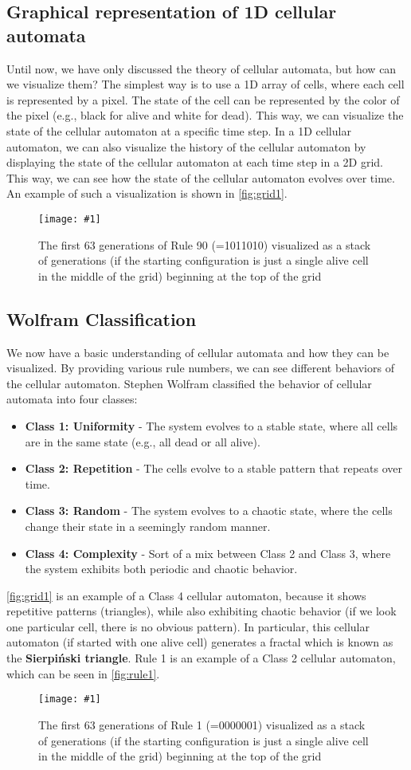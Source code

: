 \documentclass[a4paper,12pt]{llncs}
\numberwithin{equation}{section}
\newcommand{\imagewithwidth}[5]{
  \begin{figure}[htbp]%
    \begin{center}%
      \texttt{[image: \#1]}%
      \caption[#5]{#4}%
      \label{#3}%
    \end{center}%
  \end{figure}
}
\begin{document}
\subsection{Graphical representation of 1D cellular automata}
Until now, we have only discussed the theory of cellular automata, but how can we visualize them?
The simplest way is to use a 1D array of cells, where each cell is represented by a pixel.
The state of the cell can be represented by the color of the pixel (e.g., black for alive and white for dead).
This way, we can visualize the state of the cellular automaton at a specific time step.
In a 1D cellular automaton, we can also visualize the history of the cellular automaton by displaying the state of the cellular automaton at each time step in a 2D grid.
This way, we can see how the state of the cellular automaton evolves over time.
An example of such a visualization is shown in \autoref{fig:grid1}.
\imagewithwidth{figures/rule90}{0.4\textwidth}{fig:grid1}{The first 63 generations of Rule 90 (=1011010) visualized as a stack of generations (if the starting configuration is just a single alive cell in the middle of the grid) beginning at the top of the grid}{}
\subsection{Wolfram Classification}
We now have a basic understanding of cellular automata and how they can be visualized.
By providing various rule numbers, we can see different behaviors of the cellular automaton.
Stephen Wolfram classified the behavior of cellular automata into four classes:
\begin{itemize}
  \item \textbf{Class 1: Uniformity} - The system evolves to a stable state, where all cells are in the same state (e.g., all dead or all alive).
  \item \textbf{Class 2: Repetition} - The cells evolve to a stable pattern that repeats over time.
  \item \textbf{Class 3: Random} - The system evolves to a chaotic state, where the cells change their state in a seemingly random manner.
  \item \textbf{Class 4: Complexity} - Sort of a mix between Class 2 and Class 3, where the system exhibits both periodic and chaotic behavior.
\end{itemize}
\autoref{fig:grid1} is an example of a Class 4 cellular automaton, because it shows repetitive patterns (triangles), while also exhibiting chaotic behavior (if we look one particular cell, there is no obvious pattern). In particular, this cellular automaton (if started with one alive cell) generates a fractal which is known as the \textbf{Sierpiński triangle}.
Rule 1 is an example of a Class 2 cellular automaton, which can be seen in \autoref{fig:rule1}.
\imagewithwidth{figures/rule1}{0.4\textwidth}{fig:rule1}{The first 63 generations of Rule 1 (=0000001) visualized as a stack of generations (if the starting configuration is just a single alive cell in the middle of the grid) beginning at the top of the grid}{}
\end{document}
